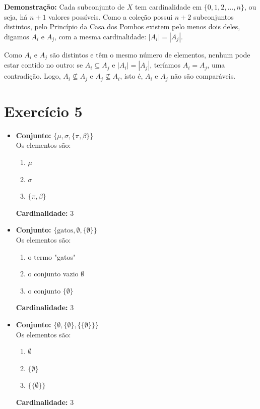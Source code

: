 \documentclass[11pt,reqno,a4paper]{amsart}
\begin{document}
\textbf{Demonstração: }
Cada subconjunto de $X$ tem cardinalidade em $\{0, 1, 2, \dots, n\}$, ou seja, há $n+1$ valores possíveis. Como a coleção possui $n+2$ subconjuntos distintos, pelo Princípio da Casa dos Pombos existem pelo menos dois deles, digamos $A_i$ e $A_j$, com a mesma cardinalidade: $|A_i| = |A_j|$.

Como $A_i$ e $A_j$ são distintos e têm o mesmo número de elementos, nenhum pode estar contido no outro: se $A_i \subseteq A_j$ e $|A_i| = |A_j|$, teríamos $A_i = A_j$, uma contradição. Logo, $A_i \not\subseteq A_j$ e $A_j \not\subseteq A_i$, isto é, $A_i$ e $A_j$ não são comparáveis.

\newpage
\section*{Exercício 5}

\begin{itemize}
    \item \textbf{Conjunto:} $\{\mu, \sigma, \{\pi, \beta\}\}$ \\
    Os elementos são:
    \begin{enumerate}
        \item $\mu$
        \item $\sigma$
        \item $\{\pi, \beta\}$
    \end{enumerate}
    \textbf{Cardinalidade:} 3

    \item \textbf{Conjunto:} $\{\text{gatos}, \emptyset, \{\emptyset\}\}$ \\
    Os elementos são:
    \begin{enumerate}
        \item o termo "gatos"
        \item o conjunto vazio $\emptyset$
        \item o conjunto $\{\emptyset\}$
    \end{enumerate}
    \textbf{Cardinalidade:} 3

    \item \textbf{Conjunto:} $\{\emptyset, \{\emptyset\}, \{\{\emptyset\}\}\}$ \\
    Os elementos são:
    \begin{enumerate}
        \item $\emptyset$
        \item $\{\emptyset\}$
        \item $\{\{\emptyset\}\}$
    \end{enumerate}
    \textbf{Cardinalidade:} 3
\end{itemize}
\end{document}
